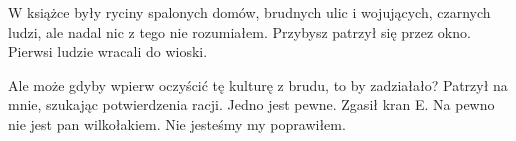W książce były ryciny spalonych domów, brudnych ulic i wojujących, czarnych ludzi, ale nadal nic z tego nie rozumiałem.
Przybysz patrzył się przez okno. Pierwsi ludzie wracali do wioski.

\begin{dialogue}
\ds{} Ale może gdyby wpierw oczyścić tę kulturę z brudu, to by zadziałało? \dm{} Patrzył na mnie, szukając potwierdzenia racji.
\dm{} Jedno jest pewne. \dm{} Zgasił kran E. \dm{} Na pewno nie jest pan wilkołakiem.
\ds{} Nie jesteśmy my \dm{} poprawiłem.
\end{dialogue}














